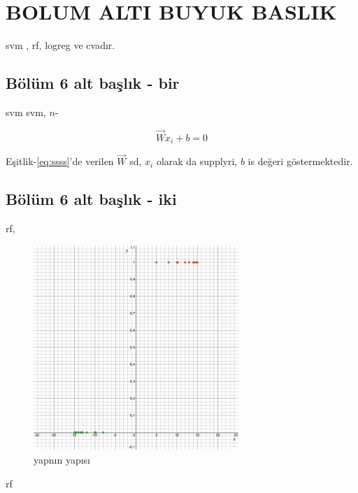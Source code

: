 \chapter{BOLUM ALTI BUYUK BASLIK}
\lipsum[1-2]
\acrlong{svm} , \acrlong{rf}, \acrlong{logreg}  ve \acrlong{cva}dır.

\section{Bölüm 6 alt başlık - bir}
\lipsum[3-4]
\acrfull{svm}  
\parencite{Hearst1998} 
\lipsum[6-8]
\acrshort{svm},  
$n$-\lipsum[11]

\begin{equation}
\overrightarrow{W}x_{i}+b = 0
\label{eq:ssss}%
\end{equation}

Eşitlik-\ref{eq:ssss}'de verilen $\overrightarrow{W}$ sd, $x_{i}$ olarak da supplyri, $b$ is değeri göstermektedir.

\lipsum[4]

\section{Bölüm 6 alt başlık - iki}
\lipsum[1-2]

\acrfull{rf}, 
\lipsum[8-10]


\begin{figure}[htp]
\centering
\includegraphics[width=0.69\textwidth]{gorseller/graph1.png}
\caption{yapnın yapısı}\label{fig:randomforest}
\end{figure}

\acrshort{rf}

\lipsum[3]

